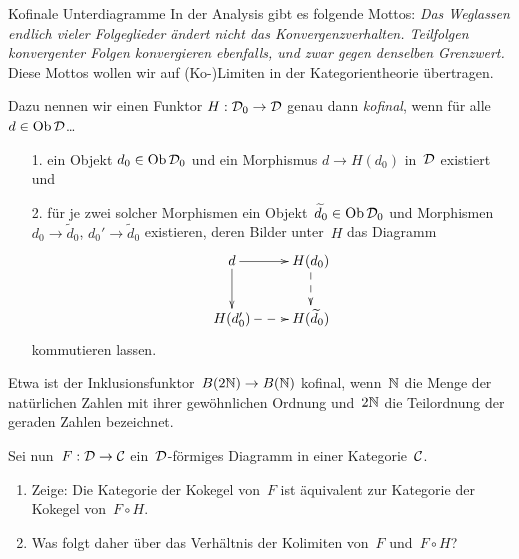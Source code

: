 \documentclass{pizzablatt}
\begin{document}
\begin{aufgabe}{Kofinale Unterdiagramme}\small
In der Analysis gibt es folgende Mottos: \emph{Das Weglassen endlich vieler Folgeglieder
ändert nicht das Konvergenzverhalten. Teilfolgen konvergenter Folgen
konvergieren ebenfalls, und zwar gegen denselben Grenzwert.} Diese Mottos
wollen wir auf (Ko-)Limiten in der Kategorientheorie übertragen.

Dazu nennen wir einen Funktor $H : \mathcal{D}_0 \to \mathcal{D}$ genau dann \emph{kofinal}, wenn
für alle~$d \in \operatorname{Ob}\mathcal{D}$\ldots
\begin{enumerate}
\item[1.] ein Objekt $d_0 \in \operatorname{Ob}\mathcal{D}_0$ und ein Morphismus $d \to
H(d_0)$ in~$\mathcal{D}$ existiert und
\item[2.] für je zwei solcher Morphismen ein Objekt~$\widetilde d_0 \in \operatorname{Ob}\mathcal{D}_0$ und
Morphismen $d_0 \to \widetilde d_0$, $d_0' \to \widetilde d_0$ existieren, deren Bilder
unter~$H$ das Diagramm
\[ \xymatrix{
  d \ar[r] \ar[d] & H(d_0) \ar@{-->}[d] \\
  H(d_0') \ar@{-->}[r] & H(\widetilde d_0)
} \]
kommutieren lassen.
\end{enumerate}
Etwa ist der Inklusionsfunktor~$B (2\mathbb{N}) \to B(\mathbb{N})$ kofinal, wenn~$\mathbb{N}$ die
Menge der natürlichen Zahlen mit ihrer gewöhnlichen Ordnung und~$2\mathbb{N}$ die
Teilordnung der geraden Zahlen bezeichnet.

Sei nun~$F : \mathcal{D} \to \mathcal{C}$ ein~$\mathcal{D}$-förmiges Diagramm in einer Kategorie~$\mathcal{C}$.
\begin{enumerate}
\item
Zeige: Die Kategorie der Kokegel von~$F$ ist äquivalent zur Kategorie der
Kokegel von~$F \circ H$.
\item Was folgt daher über das Verhältnis der Kolimiten von~$F$ und~$F \circ
H$?
\end{enumerate}
\end{aufgabe}
\end{document}
